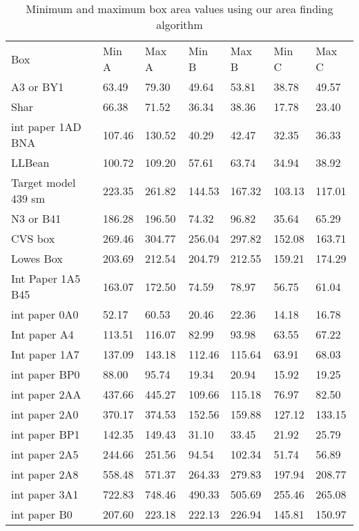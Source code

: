 \documentclass[11pt, twoside, reqno]{book}
\begin{document}
\FloatBarrier

\begin{table}[]
	\centering

	\label{AR2Dl}
	\begin{tabular}{lllllll}
		Box                 & Min A  & Max A  & Min B  & Max B  & Min C  & Max C  \\
		A3 or BY1           & 63.49  & 79.30  & 49.64  & 53.81  & 38.78  & 49.57  \\
		Shar                & 66.38  & 71.52  & 36.34  & 38.36  & 17.78  & 23.40  \\
		int paper 1AD BNA   & 107.46 & 130.52 & 40.29  & 42.47  & 32.35  & 36.33  \\
		LLBean              & 100.72 & 109.20 & 57.61  & 63.74  & 34.94  & 38.92  \\
		Target model 439 sm & 223.35 & 261.82 & 144.53 & 167.32 & 103.13 & 117.01 \\
		N3 or B41           & 186.28 & 196.50 & 74.32  & 96.82  & 35.64  & 65.29  \\
		CVS box             & 269.46 & 304.77 & 256.04 & 297.82 & 152.08 & 163.71 \\
		Lowes Box           & 203.69 & 212.54 & 204.79 & 212.55 & 159.21 & 174.29 \\
		Int Paper 1A5 B45   & 163.07 & 172.50 & 74.59  & 78.97  & 56.75  & 61.04  \\
		int paper 0A0       & 52.17  & 60.53  & 20.46  & 22.36  & 14.18  & 16.78  \\
		Int paper A4        & 113.51 & 116.07 & 82.99  & 93.98  & 63.55  & 67.22  \\
		Int paper 1A7       & 137.09 & 143.18 & 112.46 & 115.64 & 63.91  & 68.03  \\
		int paper BP0       & 88.00  & 95.74  & 19.34  & 20.94  & 15.92  & 19.25  \\
		int paper 2AA       & 437.66 & 445.27 & 109.66 & 115.18 & 76.97  & 82.50  \\
		int paper 2A0       & 370.17 & 374.53 & 152.56 & 159.88 & 127.12 & 133.15 \\
		int paper BP1       & 142.35 & 149.43 & 31.10  & 33.45  & 21.92  & 25.79  \\
		int paper 2A5       & 244.66 & 251.56 & 94.54  & 102.34 & 51.74  & 56.89  \\
		int paper 2A8       & 558.48 & 571.37 & 264.33 & 279.83 & 197.94 & 208.77 \\
		int paper 3A1       & 722.83 & 748.46 & 490.33 & 505.69 & 255.46 & 265.08 \\
		int paper B0        & 207.60 & 223.18 & 222.13 & 226.94 & 145.81 & 150.97
	\end{tabular}
\caption{Minimum and maximum box area values using our area finding algorithm}
\end{table}
\end{document}
